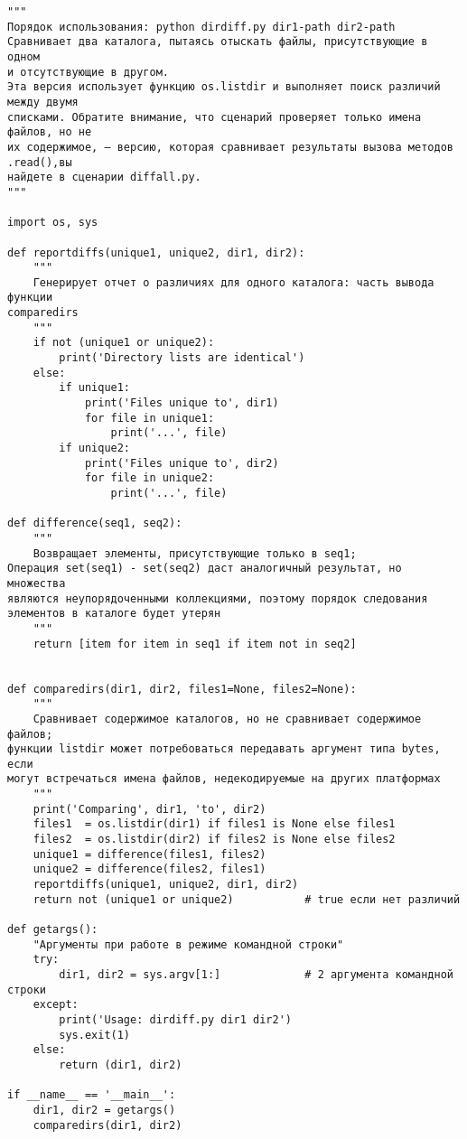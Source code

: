 \documentclass[12pt]{article}
\begin{document}
\begin{verbatim}
"""
Порядок использования: python dirdiff.py dir1-path dir2-path
Сравнивает два каталога, пытаясь отыскать файлы, присутствующие в одном
и отсутствующие в другом.
Эта версия использует функцию os.listdir и выполняет поиск различий между двумя
списками. Обратите внимание, что сценарий проверяет только имена файлов, но не
их содержимое, – версию, которая сравнивает результаты вызова методов .read(),вы
найдете в сценарии diffall.py.
"""

import os, sys

def reportdiffs(unique1, unique2, dir1, dir2):
    """
    Генерирует отчет о различиях для одного каталога: часть вывода функции
comparedirs
    """
    if not (unique1 or unique2):
        print('Directory lists are identical')
    else:
        if unique1:
            print('Files unique to', dir1)
            for file in unique1:
                print('...', file)
        if unique2:
            print('Files unique to', dir2)
            for file in unique2:
                print('...', file)

def difference(seq1, seq2):
    """
    Возвращает элементы, присутствующие только в seq1;
Операция set(seq1) - set(seq2) даст аналогичный результат, но множества
являются неупорядоченными коллекциями, поэтому порядок следования
элементов в каталоге будет утерян
    """
    return [item for item in seq1 if item not in seq2]


def comparedirs(dir1, dir2, files1=None, files2=None):
    """
    Сравнивает содержимое каталогов, но не сравнивает содержимое файлов;
функции listdir может потребоваться передавать аргумент типа bytes, если
могут встречаться имена файлов, недекодируемые на других платформах
    """
    print('Comparing', dir1, 'to', dir2)
    files1  = os.listdir(dir1) if files1 is None else files1
    files2  = os.listdir(dir2) if files2 is None else files2
    unique1 = difference(files1, files2)
    unique2 = difference(files2, files1)
    reportdiffs(unique1, unique2, dir1, dir2)
    return not (unique1 or unique2)           # true если нет различий

def getargs():
    "Аргументы при работе в режиме командной строки"
    try:
        dir1, dir2 = sys.argv[1:]             # 2 аргумента командной строки
    except:
        print('Usage: dirdiff.py dir1 dir2')
        sys.exit(1)
    else:
        return (dir1, dir2)

if __name__ == '__main__':
    dir1, dir2 = getargs()
    comparedirs(dir1, dir2)
\end{verbatim}
\end{document}
